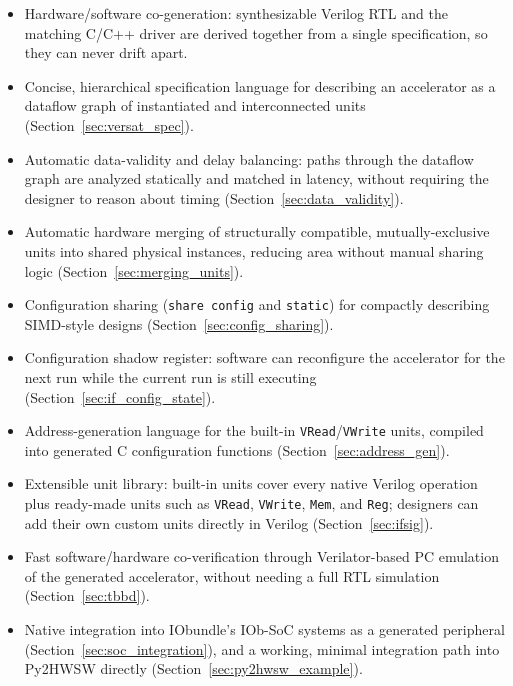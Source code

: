 %

\begin{itemize}
  \itemsep-0.5em
  \item Hardware/software co-generation: synthesizable Verilog RTL and the
    matching C/C++ driver are derived together from a single specification,
    so they can never drift apart.
  \item Concise, hierarchical specification language for describing an
    accelerator as a dataflow graph of instantiated and interconnected
    units (Section~\ref{sec:versat_spec}).
  \item Automatic data-validity and delay balancing: paths through the
    dataflow graph are analyzed statically and matched in latency, without
    requiring the designer to reason about timing (Section~\ref{sec:data_validity}).
  \item Automatic hardware merging of structurally compatible,
    mutually-exclusive units into shared physical instances, reducing area
    without manual sharing logic (Section~\ref{sec:merging_units}).
  \item Configuration sharing (\texttt{share config} and \texttt{static})
    for compactly describing SIMD-style designs (Section~\ref{sec:config_sharing}).
  \item Configuration shadow register: software can reconfigure the
    accelerator for the next run while the current run is still executing
    (Section~\ref{sec:if_config_state}).
  \item Address-generation language for the built-in \texttt{VRead}/\texttt{VWrite}
    units, compiled into generated C configuration functions
    (Section~\ref{sec:address_gen}).
  \item Extensible unit library: built-in units cover every native Verilog
    operation plus ready-made units such as \texttt{VRead}, \texttt{VWrite},
    \texttt{Mem}, and \texttt{Reg}; designers can add their own custom
    units directly in Verilog (Section~\ref{sec:ifsig}).
  \item Fast software/hardware co-verification through Verilator-based PC
    emulation of the generated accelerator, without needing a full RTL
    simulation (Section~\ref{sec:tbbd}).
  \item Native integration into IObundle's IOb-SoC systems as a generated
    peripheral (Section~\ref{sec:soc_integration}), and a working, minimal
    integration path into Py2HWSW directly (Section~\ref{sec:py2hwsw_example}).
\end{itemize}
